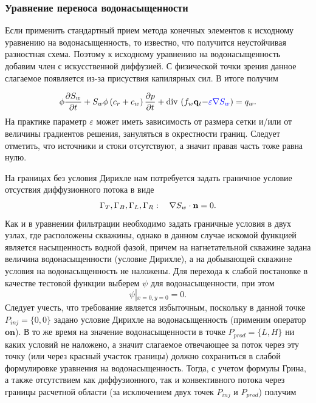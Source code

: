 \subsubsection{Уравнение переноса водонасыщенности}

Если применить стандартный прием метода конечных элементов к исходному уравнению на водонасыщенность, то известно, что получится неустойчивая разностная схема. 
Поэтому к исходному уравнению на водонасыщенность добавим член с искусственной диффузией. С физической точки зрения данное слагаемое появляется из-за присуствия капилярных сил. В итоге получим 

\begin{equation}\label{eq:satur_diffusion}
	\phi \dfrac{\partial S_w}{\partial t} + S_w\phi\left(c_r + c_w \right)\dfrac{\partial p}{\partial t} + \operatorname{div}\, \left( f_w \mathbf{q}_t {- \color{blue}\varepsilon \nabla S_w} \right) = 
	q_w.
\end{equation}
На практике параметр $\varepsilon$ может иметь зависимость от размера сетки и/или от 
величины градиентов решения, зануляться в окрестности границ. Следует отметить, что источники и стоки
отсутствуют, а значит правая часть  тоже равна нулю.

На границах без условия Дирихле нам потребуется задать граничное условие отсуствия диффузионного потока в виде
\begin{equation}\label{eq:GammaTBLR_Sw_diffusion}
	\Gamma_T, \Gamma_B, \Gamma_L, \Gamma_R: \quad \nabla S_w \cdot \mathbf{n} = 0.
\end{equation}
Как и в уравнении фильтрации необходимо задать граничные условия в двух узлах, где расположены скважины,
однако в данном случае искомой функцией является насыщенность водной фазой, причем на нагнетательной скважине
задана величина водонасыщенности (условие Дирихле), а на добывающей скважине условия на водонасыщенность не наложены.
Для перехода к слабой постановке в качестве тестовой функции выберем $\psi$ для водонасыщенности, при этом 
\begin{equation}\label{eq:psi_equal_zero}
	\psi\left|_{x=0, y=0}\right. = 0.
\end{equation}
Следует учесть, что требование  является избыточным, поскольку в данной 
точке $P_{inj}=\{0,0\}$ задано условие Дирихле на водонасыщенность (применим оператор $\mathbf{on}$). В то же время на значение водонасыщенности в точке
$P_{prod}=\{L,H\}$ ни каких условий не наложено, а значит слагаемое отвечающее за поток через эту точку
(или через красный участок границы)
должно сохраниться в слабой формулировке уравнения на водонасыщенность.
Тогда, с учетом формулы Грина, а также отсутствием как диффузионного, так и конвективного потока через границы
расчетной области (за исключением двух точек $P_{inj}$ и $P_{prod}$) получим

